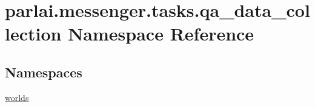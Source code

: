 \hypertarget{namespaceparlai_1_1messenger_1_1tasks_1_1qa__data__collection}{}\section{parlai.\+messenger.\+tasks.\+qa\+\_\+data\+\_\+collection Namespace Reference}
\label{namespaceparlai_1_1messenger_1_1tasks_1_1qa__data__collection}
\subsection*{Namespaces}
\begin{DoxyCompactItemize}
\item 
 \hyperlink{namespaceparlai_1_1messenger_1_1tasks_1_1qa__data__collection_1_1worlds}{worlds}
\end{DoxyCompactItemize}
